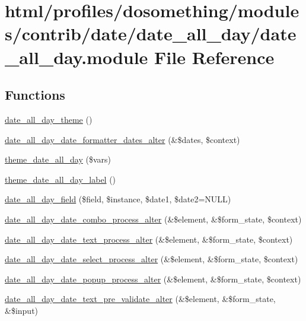 \hypertarget{date__all__day_8module}{
\section{html/profiles/dosomething/modules/contrib/date/date\_\-all\_\-day/date\_\-all\_\-day.module File Reference}
\label{date__all__day_8module}
}
\subsection*{Functions}
\begin{DoxyCompactItemize}
\item 
\hyperlink{date__all__day_8module_a7edcfcaf78ee4f273c521bd634b31d7b}{date\_\-all\_\-day\_\-theme} ()
\item 
\hyperlink{date__all__day_8module_a1ab2c15d1dfed16ce758574dd9e3ccad}{date\_\-all\_\-day\_\-date\_\-formatter\_\-dates\_\-alter} (\&\$dates, \$context)
\item 
\hyperlink{date__all__day_8module_a03048bd6261e056d3ac6f15fb223a0e0}{theme\_\-date\_\-all\_\-day} (\$vars)
\item 
\hyperlink{date__all__day_8module_a7f79e6f46a156f9901c910ac95be7382}{theme\_\-date\_\-all\_\-day\_\-label} ()
\item 
\hyperlink{date__all__day_8module_ac20133ba5eee4f790d2a29eed85b1a91}{date\_\-all\_\-day\_\-field} (\$field, \$instance, \$date1, \$date2=NULL)
\item 
\hyperlink{date__all__day_8module_ac553505a37b6dc07558e764e9b7e11af}{date\_\-all\_\-day\_\-date\_\-combo\_\-process\_\-alter} (\&\$element, \&\$form\_\-state, \$context)
\item 
\hyperlink{date__all__day_8module_a1303234af56bf777340291beb37d9e88}{date\_\-all\_\-day\_\-date\_\-text\_\-process\_\-alter} (\&\$element, \&\$form\_\-state, \$context)
\item 
\hyperlink{date__all__day_8module_a03eba5b1126dcdea600f9186d3d9bc33}{date\_\-all\_\-day\_\-date\_\-select\_\-process\_\-alter} (\&\$element, \&\$form\_\-state, \$context)
\item 
\hyperlink{date__all__day_8module_a2abea20ffe8ef05e518da5cf1f7b3b9f}{date\_\-all\_\-day\_\-date\_\-popup\_\-process\_\-alter} (\&\$element, \&\$form\_\-state, \$context)
\item 
\hyperlink{date__all__day_8module_aa3e08cbb1ae3d12b7850442cfc4721f1}{date\_\-all\_\-day\_\-date\_\-text\_\-pre\_\-validate\_\-alter} (\&\$element, \&\$form\_\-state, \&\$input)

\end{DoxyCompactItemize}

